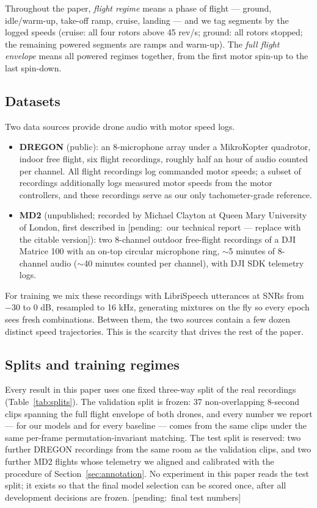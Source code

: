 \documentclass[journal]{IEEEtran}
\newcommand{\pending}[1]{{\color{gray}\textsf{[pending:~#1]}}}
\begin{document}
Throughout the paper, \emph{flight regime} means a phase of flight --- ground,
idle/warm-up, take-off ramp, cruise, landing --- and we tag segments by the
logged speeds (cruise: all four rotors above 45 rev/s; ground: all rotors
stopped; the remaining powered segments are ramps and warm-up). The \emph{full
flight envelope} means all powered regimes together, from the first motor
spin-up to the last spin-down.

\subsection{Datasets}
\label{sec:datasets}

Two data sources provide drone audio with motor speed logs.

\begin{itemize}
\item \textbf{DREGON} \cite{strauss2018dregon} (public): an 8-microphone array under a
  MikroKopter quadrotor, indoor free flight, six flight recordings, roughly
  half an hour of audio counted per channel. All flight recordings log
  commanded motor speeds; a subset of recordings additionally logs measured
  motor speeds from the motor controllers, and these recordings serve as our
  only tachometer-grade reference.
\item \textbf{MD2} (unpublished; recorded by Michael Clayton at Queen Mary
  University of London, first described in \pending{our technical report ---
  replace with the citable version}): two 8-channel outdoor free-flight
  recordings of a DJI Matrice 100 with an on-top circular microphone ring,
  $\sim$5 minutes of 8-channel audio ($\sim$40 minutes counted per channel),
  with DJI SDK telemetry logs.
\end{itemize}

For training we mix these recordings with LibriSpeech utterances at SNRs
from $-30$ to 0 dB, resampled to 16 kHz, generating mixtures on the fly so
every epoch sees fresh combinations. Between them, the two sources contain a
few dozen distinct speed trajectories. This is the scarcity that drives the
rest of the paper.

\subsection{Splits and training regimes}
\label{sec:splits}

Every result in this paper uses one fixed three-way split of the real
recordings (Table~\ref{tab:splits}). The validation split is frozen: 37
non-overlapping 8-second clips spanning the full flight envelope of both
drones, and every number we report — for our models and for every baseline —
comes from the same clips under the same per-frame permutation-invariant
matching. The test split is reserved: two further DREGON recordings from the
same room as the validation clips, and two further MD2 flights whose
telemetry we aligned and calibrated with the procedure of
Section~\ref{sec:annotation}. No experiment in this paper reads the test
split; it exists so that the final model selection can be scored once,
after all development decisions are frozen. \pending{final test numbers}
\end{document}
